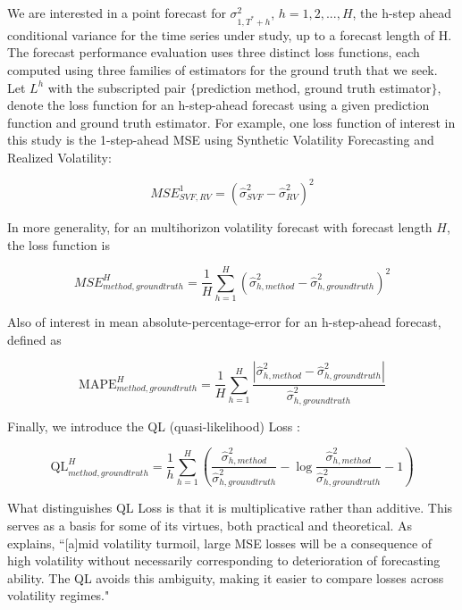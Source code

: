 \documentclass[11pt]{article}
\theoremstyle{definition}
\begin{document}

We are interested in a point forecast for $\sigma^{2}_{1,T^{*}+h}$, $h=1,2,...,H$, the h-step ahead conditional variance for the time series under study, up to a forecast length of H.  The forecast performance evaluation uses three distinct loss functions, each computed using three families of estimators for the ground truth that we seek.  Let $L^{h}$ with the subscripted pair $\{$prediction method, ground truth estimator$\}$, denote the loss function for an h-step-ahead forecast using a given prediction function and ground truth estimator.  For example, one loss function of interest in this study is the 1-step-ahead MSE using Synthetic Volatility Forecasting and Realized Volatility:

$$ MSE^{1}_{SVF, RV} = (\hat\sigma^{2}_{SVF} - \hat\sigma^{2}_{RV})^{2}$$

In more generality, for an multihorizon volatility forecast with forecast length $H$, the loss function is 

$$ MSE^{H}_{method, ground truth} = \frac{1}{H}\sum_{h=1}^{H}(\hat\sigma^{2}_{h, method} - \hat\sigma^{2}_{h, ground truth})^{2}$$

Also of interest in mean absolute-percentage-error for an h-step-ahead forecast, defined as

\[ 
\text{MAPE}^{H}_{method, ground truth} = \frac{1}{H}\sum_{h=1}^{H}\frac{|\hat\sigma^{2}_{h, method} - \hat\sigma^{2}_{h, ground truth}|}{\hat\sigma^{2}_{h, ground truth}}
\]

Finally, we introduce the QL (quasi-likelihood) Loss \citep{brownlees2011practical}:

\[ 
\text{QL}^{H}_{method, ground truth} = \frac{1}{h}\sum_{h=1}^{H} (\frac{ \hat\sigma^{2}_{h, method} }{\hat\sigma^{2}_{h, ground truth}} - \log{\frac{ \hat\sigma^{2}_{h, method} }{\hat\sigma^{2}_{h, ground truth}}} -1)
\]

What distinguishes QL Loss is that it is multiplicative rather than additive.  This serves as a basis for some of its virtues, both practical and theoretical.  As \citet{brownlees2011practical} explains, ``[a]mid volatility turmoil, large MSE
losses will be a consequence of high volatility without necessarily corresponding to
deterioration of forecasting ability. The QL avoids this ambiguity, making it easier to
compare losses across volatility regimes."
\end{document}
